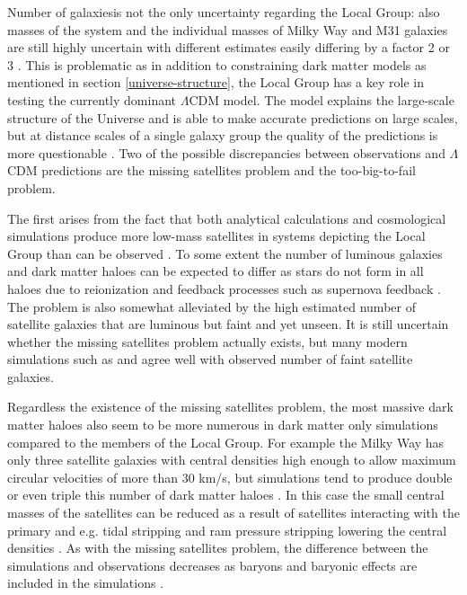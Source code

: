 \documentclass[english, oneside]{HYgradu}
\begin{document}
Number of galaxiesis not the only uncertainty regarding the Local Group: also masses of the system and the individual masses of Milky Way and M31 galaxies are still highly uncertain with different estimates easily differing by a factor 2 or 3 \citep{wang2015estimating, carlesi2016constraining}. This is problematic as in addition to constraining dark matter models as mentioned in section \ref{universe-structure}, the Local Group has a key role in testing the currently dominant $\Lambda$CDM model. The model explains the large-scale structure of the Universe and is able to make accurate predictions on large scales, but at distance scales of a single galaxy group the quality of the predictions is more questionable \citep{bullock2017small}. Two of the possible discrepancies between observations and $\Lambda$CDM predictions are the missing satellites problem and the too-big-to-fail problem.

The first arises from the fact that both analytical calculations and cosmological simulations produce more low-mass satellites in systems depicting the Local Group than can be observed \citep{klypin1999missing}. To some extent the number of luminous galaxies and dark matter haloes can be expected to differ as stars do not form in all haloes due to reionization and feedback processes such as supernova feedback \citep{efstathiou1992suppressing, larson1974effects}. The problem is also somewhat alleviated by the high estimated number of satellite galaxies that are luminous but faint and yet unseen. It is still uncertain whether the missing satellites problem actually exists, but many modern simulations such as \citep{ garrison2014elvis} and \citep{sawala2016apostle} agree well with observed number of faint satellite galaxies.

Regardless the existence of the missing satellites problem, the most massive dark matter haloes also seem to be more numerous in dark matter only simulations compared to the members of the Local Group. For example the Milky Way has only three satellite galaxies with central densities high enough to allow maximum circular velocities of more than 30 km/s, but simulations tend to produce double or even triple this number of dark matter haloes \citep{sawala2016apostle}. In this case the small central masses of the satellites can be reduced as a result of satellites interacting with the primary and e.g. tidal stripping and ram pressure stripping lowering the central densities \citep{bullock2017small}. As with the missing satellites problem, the difference between the simulations and observations decreases as baryons and baryonic effects are included in the simulations \citep{sawala2016apostle}.
\end{document}
